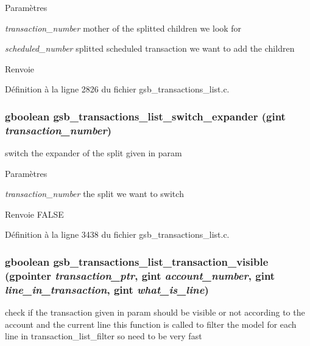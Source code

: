 \begin{DoxyParams}{Paramètres}
\item[{\em transaction\_\-number}]mother of the splitted children we look for \item[{\em scheduled\_\-number}]splitted scheduled transaction we want to add the children\end{DoxyParams}
\begin{DoxyReturn}{Renvoie}

\end{DoxyReturn}


Définition à la ligne 2826 du fichier gsb\_\-transactions\_\-list.c.

\subsubsection[{gsb\_\-transactions\_\-list\_\-switch\_\-expander}]{\setlength{\rightskip}{0pt plus 5cm}gboolean gsb\_\-transactions\_\-list\_\-switch\_\-expander (gint {\em transaction\_\-number})}\label{gsb__transactions__list_8c_a6089f07015c6278f5d0a689783fe4019}
switch the expander of the split given in param


\begin{DoxyParams}{Paramètres}
\item[{\em transaction\_\-number}]the split we want to switch\end{DoxyParams}
\begin{DoxyReturn}{Renvoie}
FALSE 
\end{DoxyReturn}


Définition à la ligne 3438 du fichier gsb\_\-transactions\_\-list.c.

\subsubsection[{gsb\_\-transactions\_\-list\_\-transaction\_\-visible}]{\setlength{\rightskip}{0pt plus 5cm}gboolean gsb\_\-transactions\_\-list\_\-transaction\_\-visible (gpointer {\em transaction\_\-ptr}, \/  gint {\em account\_\-number}, \/  gint {\em line\_\-in\_\-transaction}, \/  gint {\em what\_\-is\_\-line})}\label{gsb__transactions__list_8c_a3fea90bc90cbcb2b613935cb657fd320}
check if the transaction given in param should be visible or not according to the account and the current line this function is called to filter the model for each line in transaction\_\-list\_\-filter so need to be very fast


